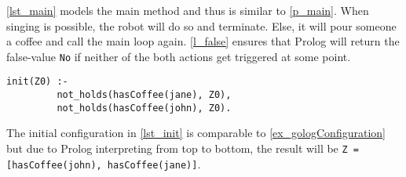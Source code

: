 \autoref{lst_main} models the main method and thus is similar to \autoref{p_main}. When singing is possible, the robot will do so and terminate. Else, it will pour someone a coffee and call the main loop again. \autoref{l_false} ensures that Prolog will return the false-value \texttt{No} if neither of the both actions get triggered at some point.
\begin{lstlisting}[firstnumber=17, caption={Initial configuration.}, label=lst_init]
  init(Z0) :-
         not_holds(hasCoffee(jane), Z0),
         not_holds(hasCoffee(john), Z0).
\end{lstlisting}
The initial configuration in \autoref{lst_init} is comparable to \autoref{ex_gologConfiguration} but due to Prolog interpreting from top to bottom, the result will be \texttt{Z = [hasCoffee(john), hasCoffee(jane)]}.
